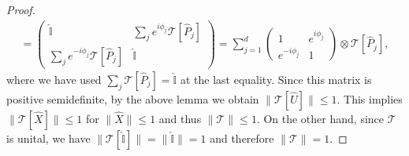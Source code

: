 \documentclass[10pt,a4paper]{amsart}
\newcommand{\mbb}[1]{\mathbb{#1}}
\newcommand{\mc}[1]{\mathcal{#1}}
\begin{document}
\begin{proof}
\begin{align}
= \begin{pmatrix} \hat{\mbb{I}} & \sum_j e^{i\phi_j} \mc{T}[\hat{P}_j] \\ \sum_j e^{-i\phi_j} \mc{T}[\hat{P}_j] & \hat{\mbb{I}} \end{pmatrix}
= \sum_{j=1}^d \begin{pmatrix} 1 & e^{i\phi_j} \\ e^{-i\phi_j} & 1 \end{pmatrix} \otimes \mc{T}[\hat{P}_j],
\end{align}
where we have used $\sum_j \mc{T}[\hat{P}_j] = \hat{\mbb{I}}$ at the last equality. 
Since this matrix is positive semidefinite, by the above lemma we obtain $\lVert \mc{T}[\hat{U}] \rVert \leq 1$. 
This implies $\lVert \mc{T}[\hat{X}] \rVert \leq 1$ for $\lVert \hat{X} \rVert \leq 1$ and thus $\lVert \mc{T} \rVert \leq 1$. 
On the other hand, since $\mc{T}$ is unital, we have $\lVert \mc{T}[\hat{\mbb{I}}] \rVert = \lVert \hat{\mbb{I}} \rVert = 1$ and therefore $\lVert \mc{T} \rVert = 1$.
\end{proof}
\end{document}
